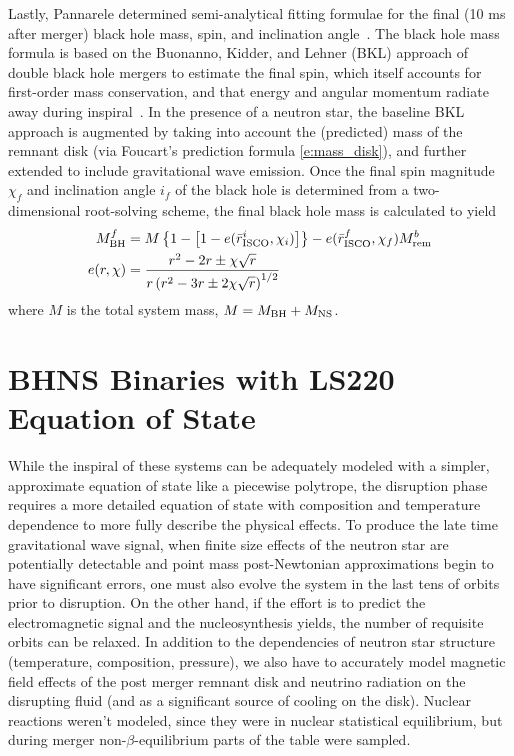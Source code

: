 Lastly, Pannarele determined semi-analytical fitting formulae for the final (10 ms after merger) black hole mass, spin, and inclination angle~\cite{PannaraleEtAl2013,Pannarale:2014}.
The black hole mass formula is based on the Buonanno, Kidder, and Lehner (BKL) approach of double black hole mergers to estimate the final spin, which itself accounts for first-order mass conservation, and that energy and angular momentum radiate away during inspiral~\cite{Buonanno2008a}.  
In the presence of a neutron star, the baseline BKL approach is augmented by taking into account the (predicted) mass of the remnant disk (via Foucart's prediction formula \ref{e:mass_disk}), and further extended to include gravitational wave emission.
Once the final spin magnitude  $\chi_f$ and inclination angle $i_f$ of the black hole is determined from a two-dimensional root-solving scheme, the final black hole mass is calculated to yield
\begin{align}
M^f_{\rm BH} &= 
M \left \{ 
1 - \left[1-e(\bar{r}^i_{\rm ISCO}, \chi_i) \right]
\right \}
- e(\bar{r}^f_{\rm ISCO}, \chi_f) M^b_{\rm rem}\\
e(r, \chi) &= 
\frac{ r^2 - 2 r \pm \chi \sqrt{r} }
{ r \left(r^2 - 3r \pm 2 \chi \sqrt{r}\right)^{1/2} }
\end{align}
where $M$ is the total system mass, $M = M_{\rm BH} +M_{\rm NS}$.

\section{BHNS Binaries with LS220 Equation of State}

While the inspiral of these systems can be adequately modeled with a simpler, approximate equation of state like a piecewise polytrope, the disruption phase requires a more detailed equation of state with composition and temperature dependence to more fully describe the physical effects.  
To produce the late time gravitational wave signal, when finite size effects of the neutron star are potentially detectable and point mass post-Newtonian approximations begin to have significant errors, one must also evolve the system in the last tens of orbits prior to disruption.  
On the other hand, if the effort is to predict the electromagnetic signal and the nucleosynthesis yields, the number of requisite orbits can be relaxed.  
In addition to the dependencies of neutron star structure (temperature, composition, pressure), we also have to accurately model magnetic field effects of the post merger remnant disk and neutrino radiation on the disrupting fluid (and as a significant source of cooling on the disk).
Nuclear reactions weren't modeled, since they were in nuclear statistical equilibrium, but during merger non-$\beta$-equilibrium parts of the table were sampled.

